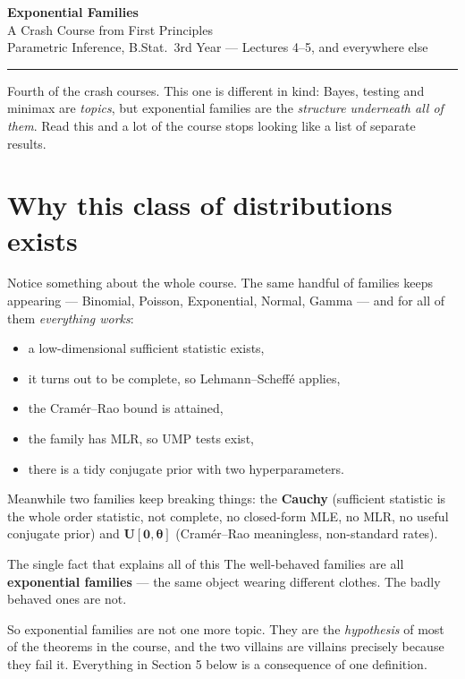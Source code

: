 \documentclass[11pt]{article}
\begin{document}
\begin{center}
{\LARGE\bfseries Exponential Families}\\[3pt]
{\large A Crash Course from First Principles}\\[5pt]
{\small Parametric Inference, B.Stat.\ 3rd Year --- Lectures 4--5, and everywhere else}
\end{center}

\vspace{4pt}\hrule\vspace{10pt}

\noindent
Fourth of the crash courses. This one is different in kind: Bayes, testing and minimax are
\emph{topics}, but exponential families are the \emph{structure underneath all of them}. Read
this and a lot of the course stops looking like a list of separate results.

\tableofcontents

\section{Why this class of distributions exists}

Notice something about the whole course. The same handful of families keeps appearing ---
Binomial, Poisson, Exponential, Normal, Gamma --- and for all of them \emph{everything works}:
\begin{itemize}
\item a low-dimensional sufficient statistic exists,
\item it turns out to be complete, so Lehmann--Scheff\'e applies,
\item the Cram\'er--Rao bound is attained,
\item the family has MLR, so UMP tests exist,
\item there is a tidy conjugate prior with two hyperparameters.
\end{itemize}
Meanwhile two families keep breaking things: the \textbf{Cauchy} (sufficient statistic is the
whole order statistic, not complete, no closed-form MLE, no MLR, no useful conjugate prior)
and $\boldsymbol{U[0,\theta]}$ (Cram\'er--Rao meaningless, non-standard rates).

\begin{idea}{The single fact that explains all of this}
The well-behaved families are all \textbf{exponential families} --- the same object wearing
different clothes. The badly behaved ones are not.

So exponential families are not one more topic. They are the \emph{hypothesis} of most of the
theorems in the course, and the two villains are villains precisely because they fail it.
Everything in Section 5 below is a consequence of one definition.
\end{idea}
\end{document}
